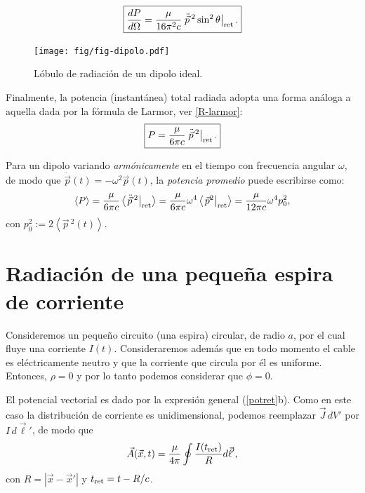 \begin{equation}
\boxed{\frac{dP}{d\Omega}%
=\frac{\mu}{16\pi^2 c}\left.{\ddot{\vec{p}}{\,}^2}\sin^2\theta\right|_{\rm ret}.}
\end{equation}
\begin{figure}[H]
\centerline{\texttt{[image: fig/fig-dipolo.pdf]}}
 \caption{Lóbulo de radiación de un dipolo ideal.}
\label{fig-dipolo}
\end{figure}
Finalmente, la potencia (instantánea) total radiada adopta una forma análoga a aquella dada por la fórmula de Larmor, ver \eqref{R-larmor}:
\begin{equation}\label{PotdH}
\boxed{P=\frac{\mu}{6\pi c}\left.\ddot{\vec{p}}{\,}^2\right|_{\rm ret}.}
\end{equation}

Para un dipolo variando \textit{armónicamente} en el tiempo con frecuencia angular $\omega$, de modo que $\ddot{\vec{p}}(t)=-\omega^2\vec{p}(t)$, la \textit{potencia promedio} puede escribirse como:
\begin{equation}
\left\langle P\right\rangle
=\frac{\mu}{6\pi c}\left\langle\left.\ddot{\vec{p}}{\,}^2\right|_{\rm ret}\right\rangle 
=\frac{\mu}{6\pi c}\omega^4\left\langle\left.\vec{p}^2\right|_{\rm ret}\right\rangle
=\frac{\mu}{12\pi c}\omega^4 p_0^2,
\end{equation}
con $p_0^2:=2\left\langle \vec{p}{\,}^2(t)\right\rangle$.


\section{Radiación de una pequeña espira de corriente}

Consideremos un pequeño circuito (una espira) circular, de radio $a$, por el cual fluye una corriente $I(t)$. Consideraremos además que en todo momento  el cable es eléctricamente neutro y que la corriente que circula por él es uniforme. Entonces, $\rho=0$ y por lo tanto podemos considerar que $\phi=0$.

El potencial vectorial es dado por la expresión general (\ref{potret}b). Como en este caso la distribución de corriente es unidimensional, podemos reemplazar $\vec{J}\,dV'$ por $I\,d\vec{\ell} '$, de modo que
\begin{equation}
 \vec{A}(\vec{x},t)=\frac{\mu}{4\pi}\oint \frac{I(t_{\rm ret})}{R}d\vec{\ell} ' , \label{Aloop1}
\end{equation}
con $R=|\vec{x}-\vec{x}'|$ y $t_{\rm ret}=t-R/c$.

